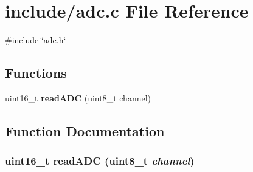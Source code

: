 \section{include/adc.c File Reference}
\label{adc_8c}
{\ttfamily \#include \char`\"{}adc.h\char`\"{}}\par
\subsection*{Functions}
\begin{DoxyCompactItemize}
\item 
uint16\_\-t {\bf readADC} (uint8\_\-t channel)
\end{DoxyCompactItemize}


\subsection{Function Documentation}
\subsubsection[{readADC}]{\setlength{\rightskip}{0pt plus 5cm}uint16\_\-t readADC (uint8\_\-t {\em channel})}\label{adc_8c_a812736491523e54e6bf10a142821e7fe}
